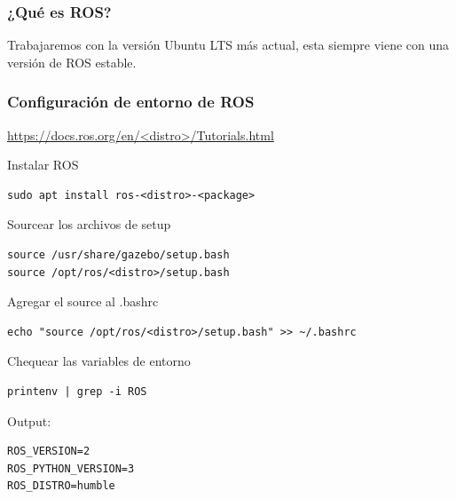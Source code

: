 \begin{frame}
	\frametitle{¿Qué es ROS?}
	  Trabajaremos con la versión Ubuntu LTS más actual, esta siempre viene con una versión de ROS estable.
	
	\begin{figure}[!h]
		\centering
	\end{figure}

\end{frame}

\begin{frame}[fragile]
	\frametitle{Configuración de entorno de ROS}
    
    \href{https://docs.ros.org/en/<distro>/Tutorials.html}{https://docs.ros.org/en/<distro>/Tutorials.html}
    
Instalar ROS
\begin{lstlisting}[style=bash]
sudo apt install ros-<distro>-<package>
\end{lstlisting}

Sourcear los archivos de setup
\begin{lstlisting}[style=bash]source /usr/share/gazebo/setup.bash
source /opt/ros/<distro>/setup.bash
\end{lstlisting}
    
Agregar el source al .bashrc
\begin{lstlisting}[style=bash]
echo "source /opt/ros/<distro>/setup.bash" >> ~/.bashrc
\end{lstlisting}

Chequear las variables de entorno
\begin{lstlisting}[style=bash]
printenv | grep -i ROS
\end{lstlisting}

Output:
\begin{lstlisting}[style=bash]
ROS_VERSION=2
ROS_PYTHON_VERSION=3
ROS_DISTRO=humble
\end{lstlisting}	
\end{frame}

